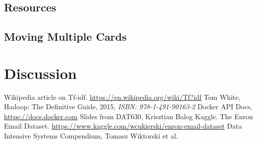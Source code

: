 \documentclass[runningheads,a4paper]{llncs}
\begin{document}
\subsection{Resources}
\subsection{Moving Multiple Cards}

\section{Discussion}



\begin{thebibliography}{6}

 Wikipedia article on Tf-idf. \url{https://en.wikipedia.org/wiki/Tf?idf}
 Tom White, Hadoop: The Definitive Guide, 2015, \emph{ISBN: 978-1-491-90163-2}
 Docker API Docs, \url{https://docs.docker.com}
 Slides from DAT630, Krisztian Balog
 Kaggle. The Enron Email Dataset. \url{https://www.kaggle.com/wcukierski/enron-email-dataset}
 Data Intensive Systems Compendium, Tomasz Wiktorski et al.

\end{thebibliography}
\end{document}
